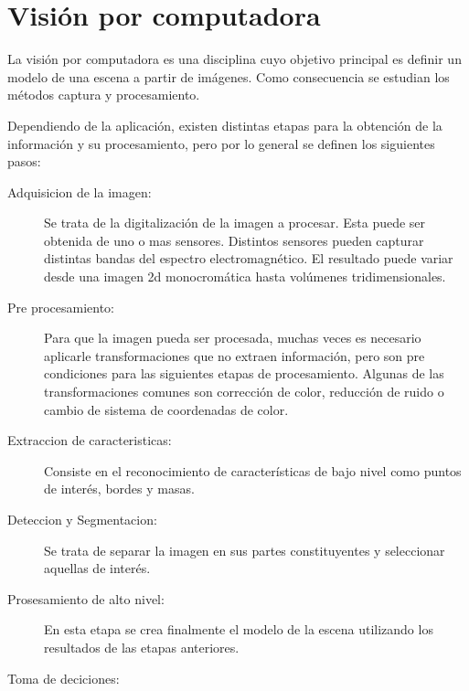
\section{Visión por computadora}

La visión por computadora es una disciplina cuyo objetivo principal es definir
un modelo de una escena a partir de imágenes\cite{cvLinda2001}. Como
consecuencia se estudian los métodos captura y procesamiento.

Dependiendo de la aplicación, existen distintas etapas para la obtención de la
información y su procesamiento, pero por lo general se definen los siguientes
pasos\cite{digitalImageProcessing2ed, wikiCV}:

\begin{description}

	\item[Adquisicion de la imagen:] Se trata de la digitalización de la
		imagen a procesar. Esta puede ser obtenida de uno o mas
		sensores. Distintos sensores pueden capturar distintas bandas
		del espectro electromagnético. El resultado puede variar desde
		una imagen 2d monocromática hasta volúmenes tridimensionales.

	\item[Pre procesamiento:] Para que la imagen pueda ser procesada, muchas
		veces es necesario aplicarle transformaciones que no extraen
		información, pero son pre condiciones para las siguientes etapas
		de procesamiento. Algunas de las transformaciones comunes son
		corrección de color, reducción de ruido o cambio de sistema de
		coordenadas de color.

	\item[Extraccion de caracteristicas:] Consiste en el reconocimiento de
		características de bajo nivel como puntos de interés, bordes y
		masas.

	\item[Deteccion y Segmentacion:] Se trata de separar la imagen en sus
		partes constituyentes y seleccionar aquellas de interés.

	\item[Prosesamiento de alto nivel:] En esta etapa se crea finalmente el
		modelo de la escena utilizando los resultados de las etapas
		anteriores.

	\item[Toma de deciciones:] 

\end{description}
